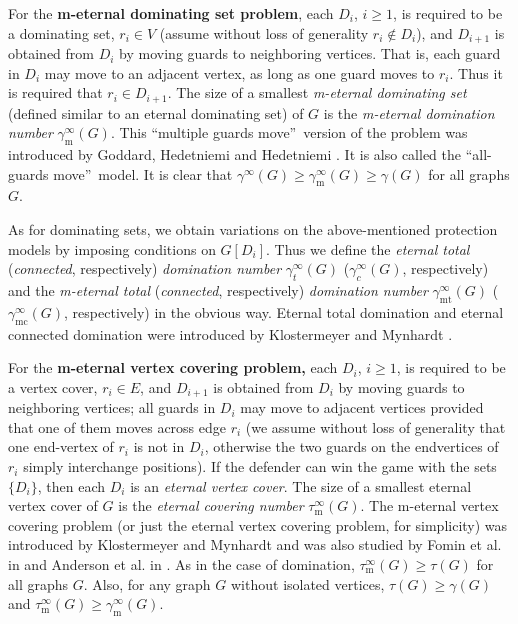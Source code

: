 \documentclass[12pt]{article}%
\begin{document}
For the \textbf{m-eternal dominating set problem}, each $D_{i}$, $i\geq1$, is
required to be a dominating set, $r_{i}\in V$ (assume without loss of
generality $r_{i}\notin D_{i}$), and $D_{i+1}$ is obtained from $D_{i}$ by
moving guards to neighboring vertices. That is, each guard in $D_{i}$ may move
to an adjacent vertex, as long as one guard moves to $r_{i}$. Thus it is
required that $r_{i}\in D_{i+1}$. The size of a smallest \emph{m-eternal
dominating set} (defined similar to an eternal dominating set) of $G$ is the
\emph{m-eternal domination number} $\gamma_{\mathrm{m}}^{\infty}(G)$. This
\textquotedblleft multiple guards move\textquotedblright\ version of the
problem was introduced by Goddard, Hedetniemi and Hedetniemi \cite{GHH}. It is
also called the \textquotedblleft all-guards move\textquotedblright\ model. It
is clear that $\gamma^{\infty}(G)\geq\gamma_{\mathrm{m}}^{\infty}(G)\geq
\gamma(G)$ for all graphs $G$.

As for dominating sets, we obtain variations on the above-mentioned protection
models by imposing conditions on $G[D_{i}]$. Thus we define the \emph{eternal
total }(\emph{connected}, respectively)\emph{ domination number} $\gamma
_{t}^{\infty}(G)$ ($\gamma_{c}^{\infty}(G)$, respectively) and the
\emph{m-eternal total }(\emph{connected}, respectively)\emph{ domination
number} $\gamma_{\mathrm{\operatorname{mt}}}^{\infty}(G)$ ($\gamma
_{\mathrm{mc}}^{\infty}(G)$, respectively) in the obvious way. Eternal total
domination and eternal connected domination were introduced by Klostermeyer
and Mynhardt \cite{KM4}.

For the \textbf{m-eternal vertex covering problem,} each $D_{i}$, $i\geq1$, is
required to be a vertex cover, $r_{i}\in E$, and $D_{i+1}$ is obtained from
$D_{i}$ by moving guards to neighboring vertices; all guards in $D_{i}$ may
move to adjacent vertices provided that one of them moves across edge $r_{i}$
(we assume without loss of generality that one end-vertex of $r_{i}$ is not in
$D_{i}$, otherwise the two guards on the endvertices of $r_{i}$ simply
interchange positions). If the defender can win the game with the sets
$\{D_{i}\}$, then each $D_{i}$ is an \emph{eternal vertex cover}. The size of
a smallest eternal vertex cover of $G$ is the \emph{eternal covering number}
$\tau_{\mathrm{m}}^{\infty}(G)$. The m-eternal vertex covering problem (or
just the eternal vertex covering problem, for simplicity) was introduced by
Klostermeyer and Mynhardt \cite{KM5} and was also studied by Fomin et al. in
\cite{gaspers, gaspers2} and Anderson et al. in \cite{ABC2, ABC}. As in the
case of domination, $\tau_{\mathrm{m}}^{\infty}(G)\geq\tau(G)$ for all graphs
$G$. Also, for any graph $G$ without isolated vertices, $\tau(G)\geq\gamma(G)$
and $\tau_{\mathrm{m}}^{\infty}(G)\geq\gamma_{\mathrm{m}}^{\infty}(G)$.
\end{document}

